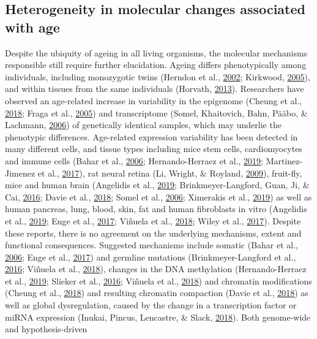 \documentclass[12pt,twoside]{unicam}
\begin{document}
\hypertarget{introHeterogeneity}{%
\subsection{Heterogeneity in molecular changes associated with age}\label{introHeterogeneity}}

Despite the ubiquity of ageing in all living organisms, the molecular mechanisms responsible still require further elucidation. Ageing differs phenotypically among individuals, including monozygotic twins (Herndon et al., \protect\hyperlink{ref-Herndon2002}{2002}; Kirkwood, \protect\hyperlink{ref-Kirkwood2005}{2005}), and within tissues from the same individuals (Horvath, \protect\hyperlink{ref-Horvath2013}{2013}). Researchers have observed an age-related increase in variability in the epigenome (Cheung et al., \protect\hyperlink{ref-Cheung2018}{2018}; Fraga et al., \protect\hyperlink{ref-Fraga2005}{2005}) and transcriptome (Somel, Khaitovich, Bahn, Pääbo, \& Lachmann, \protect\hyperlink{ref-Somel2006}{2006}) of genetically identical samples, which may underlie the phenotypic differences. Age-related expression variability has been detected in many different cells, and tissue types including mice stem cells, cardiomyocytes and immune cells (Bahar et al., \protect\hyperlink{ref-Bahar2006}{2006}; Hernando-Herraez et al., \protect\hyperlink{ref-Hernando-Herraez2019}{2019}; Martinez-Jimenez et al., \protect\hyperlink{ref-Martinez-Jimenez2017}{2017}), rat neural retina (Li, Wright, \& Royland, \protect\hyperlink{ref-Li2009}{2009}), fruit-fly, mice and human brain (Angelidis et al., \protect\hyperlink{ref-Angelidis2019}{2019}; Brinkmeyer-Langford, Guan, Ji, \& Cai, \protect\hyperlink{ref-Brinkmeyer-Langford2016}{2016}; Davie et al., \protect\hyperlink{ref-Davie2018}{2018}; Somel et al., \protect\hyperlink{ref-Somel2006}{2006}; Ximerakis et al., \protect\hyperlink{ref-Ximerakis2019}{2019}) as well as human pancreas, lung, blood, skin, fat and human fibroblasts in vitro (Angelidis et al., \protect\hyperlink{ref-Angelidis2019}{2019}; Enge et al., \protect\hyperlink{ref-Enge2017}{2017}; Viñuela et al., \protect\hyperlink{ref-Vinuela2018}{2018}; Wiley et al., \protect\hyperlink{ref-Wiley2017}{2017}). Despite these reports, there is no agreement on the underlying mechanisms, extent and functional consequences. Suggested mechanisms include somatic (Bahar et al., \protect\hyperlink{ref-Bahar2006}{2006}; Enge et al., \protect\hyperlink{ref-Enge2017}{2017}) and germline mutations (Brinkmeyer-Langford et al., \protect\hyperlink{ref-Brinkmeyer-Langford2016}{2016}; Viñuela et al., \protect\hyperlink{ref-Vinuela2018}{2018}), changes in the DNA methylation (Hernando-Herraez et al., \protect\hyperlink{ref-Hernando-Herraez2019}{2019}; Slieker et al., \protect\hyperlink{ref-Slieker2016}{2016}; Viñuela et al., \protect\hyperlink{ref-Vinuela2018}{2018}) and chromatin modifications (Cheung et al., \protect\hyperlink{ref-Cheung2018}{2018}) and resulting chromatin compaction (Davie et al., \protect\hyperlink{ref-Davie2018}{2018}) as well as global dysregulation, caused by the change in a transcription factor or miRNA expression (Inukai, Pincus, Lencastre, \& Slack, \protect\hyperlink{ref-Inukai2018}{2018}). Both genome-wide and hypothesis-driven 
\end{document}

